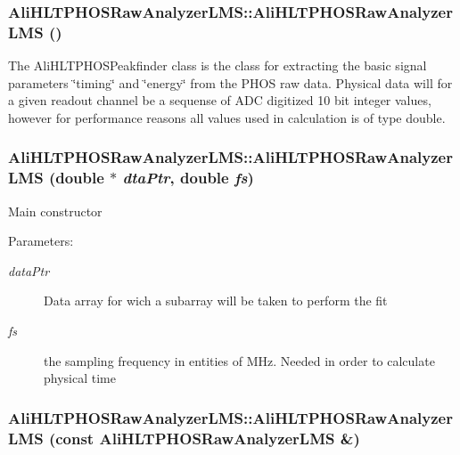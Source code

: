 \subsubsection{\setlength{\rightskip}{0pt plus 5cm}Ali\-HLTPHOSRaw\-Analyzer\-LMS::Ali\-HLTPHOSRaw\-Analyzer\-LMS ()}\label{classAliHLTPHOSRawAnalyzerLMS_a0}


The Ali\-HLTPHOSPeakfinder class is the class for extracting the basic signal parameters \char`\"{}timing\char`\"{} and \char`\"{}energy\char`\"{} from the PHOS raw data. Physical data will for a given readout channel be a sequense of ADC digitized 10 bit integer values, however for performance reasons all values used in calculation is of type double. 
\subsubsection{\setlength{\rightskip}{0pt plus 5cm}Ali\-HLTPHOSRaw\-Analyzer\-LMS::Ali\-HLTPHOSRaw\-Analyzer\-LMS (double $\ast$ {\em dta\-Ptr}, double {\em fs})}\label{classAliHLTPHOSRawAnalyzerLMS_a1}


Main constructor \begin{Desc}
\item[Parameters:]
\begin{description}
\item[{\em data\-Ptr}]Data array for wich a subarray will be taken to perform the fit \item[{\em fs}]the sampling frequency in entities of MHz. Needed in order to calculate physical time \end{description}
\end{Desc}
\subsubsection{\setlength{\rightskip}{0pt plus 5cm}Ali\-HLTPHOSRaw\-Analyzer\-LMS::Ali\-HLTPHOSRaw\-Analyzer\-LMS (const {\bf Ali\-HLTPHOSRaw\-Analyzer\-LMS} \&)}\label{classAliHLTPHOSRawAnalyzerLMS_a2}


